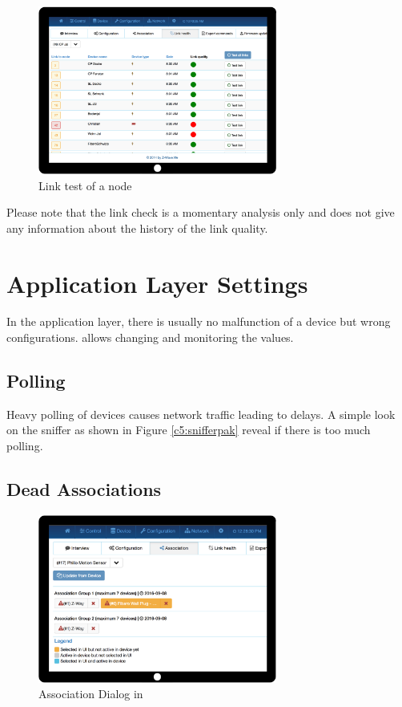 \begin{figure}
\begin{center}
\includegraphics[width=0.7\textwidth]{pngs/cap8/c5linktest.png}
\caption{Link test of a node}
\label{c5:linktest}
\end{center}
\end{figure}

Please note that the link check is a momentary analysis only and does not give any 
information about the history of the link quality.


\section{Application Layer Settings}

In the application layer, there is usually no malfunction of a device but wrong 
configurations. \zweui allows changing and monitoring the values.

\subsection{Polling}

Heavy polling of devices causes network traffic leading to delays. A simple look on the 
sniffer as shown in Figure \ref{c5:snifferpak} reveal if there is too much polling.

\subsection{Dead Associations}
\label{c5:deadassoc}

\begin{figure}
\begin{center}
\includegraphics[width=0.7\textwidth]{pngs/cap8/c4association.png}
\caption{Association Dialog in \zweui}
\label{c5:assoc}
\end{center}
\end{figure}

